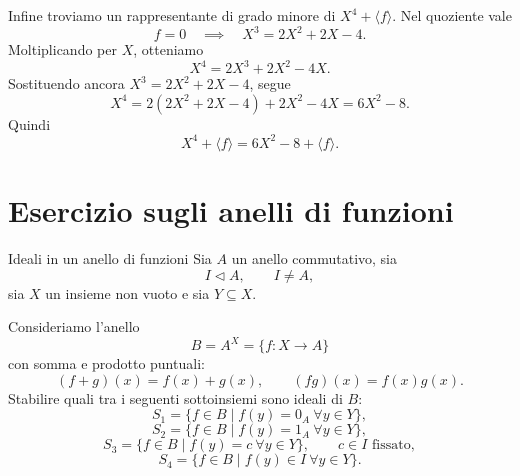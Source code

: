 \documentclass[a4paper]{article}
\begin{document}
\begin{radioactive}
\begin{snippetsolution}{}
    Infine troviamo un rappresentante di grado minore di \(X^4+\langle f \rangle\). Nel quoziente vale
    \[
        f=0
        \quad\implies\quad
        X^3=2X^2+2X-4.
    \]
    Moltiplicando per \(X\), otteniamo
    \[
        X^4=2X^3+2X^2-4X.
    \]
    Sostituendo ancora \(X^3=2X^2+2X-4\), segue
    \[
        X^4
        =
        2(2X^2+2X-4)+2X^2-4X
        =
        6X^2-8.
    \]
    Quindi
    \[
        X^4+\langle f \rangle=6X^2-8+\langle f \rangle.
    \]
\end{snippetsolution}
\end{radioactive}

\section{Esercizio sugli anelli di funzioni}

\begin{radioactive}
\begin{snippetexercise}{Ideali in un anello di funzioni}
    Sia \(A\) un anello commutativo, sia
    \[
        I\triangleleft A,
        \qquad
        I\neq A,
    \]
    sia \(X\) un insieme non vuoto e sia \(Y\subseteq X\).

    Consideriamo l'anello
    \[
        B=A^X=\{f\colon X\to A\}
    \]
    con somma e prodotto puntuali:
    \[
        (f+g)(x)=f(x)+g(x),
        \qquad
        (fg)(x)=f(x)g(x).
    \]
    Stabilire quali tra i seguenti sottoinsiemi sono ideali di \(B\):
    \[
        S_1=
        \{f\in B\mid f(y)=0_A \ \forall y\in Y\},
    \]
    \[
        S_2=
        \{f\in B\mid f(y)=1_A \ \forall y\in Y\},
    \]
    \[
        S_3=
        \{f\in B\mid f(y)=c \ \forall y\in Y\},
        \qquad
        c\in I \text{ fissato},
    \]
    \[
        S_4=
        \{f\in B\mid f(y)\in I \ \forall y\in Y\}.
    \]
\end{snippetexercise}
\end{radioactive}
\end{document}

